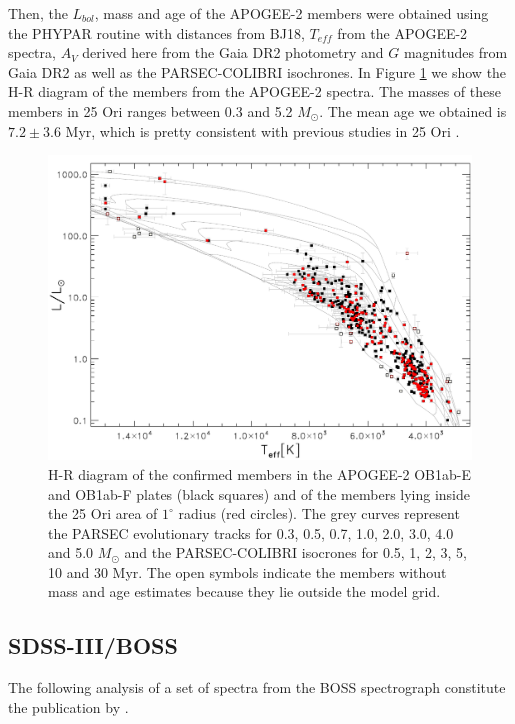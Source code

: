 \documentclass[12pt]{article}
\begin{document}
Then, the $L_{bol}$, mass and age of the APOGEE-2 members were obtained using the PHYPAR routine with distances from BJ18, $T_{eff}$ from the APOGEE-2 spectra, $A_V$ derived here from the Gaia DR2 photometry and $G$ magnitudes from Gaia DR2 as well as the PARSEC-COLIBRI isochrones. In Figure \ref{fig_APOGEE-2:HR} we show the H-R diagram of the members from the APOGEE-2 spectra. The masses of these members in 25 Ori ranges between 0.3 and 5.2 $M_\odot$. The mean age we obtained is $7.2\pm3.6$ Myr, which is pretty consistent with previous studies in 25 Ori \citep[][ and references therein]{Briceno2018}.

\begin{figure}[ht!]
	\centering
	\includegraphics[width=1.\textwidth]{HR_APOGEE-2.pdf}
	\caption[H-R diagram of the 25 Ori confirmed members from APOGEE-2 spectra.]{H-R diagram of the confirmed members in the APOGEE-2 OB1ab-E and OB1ab-F plates (black squares) and of the members lying inside the 25 Ori area of $1^\circ$ radius (red circles). The grey curves represent the PARSEC evolutionary tracks for 0.3, 0.5, 0.7, 1.0, 2.0, 3.0, 4.0 and 5.0 $M_\odot$ and the PARSEC-COLIBRI isocrones for 0.5, 1, 2, 3, 5, 10 and 30 Myr. The open symbols indicate the members without mass and age estimates because they lie outside the model grid.}
	\label{fig_APOGEE-2:HR}
\end{figure}

\subsection{SDSS-III/BOSS \citep{Suarez2017}}
\label{sec:BOSS}
The following analysis of a set of spectra from the BOSS spectrograph constitute the publication by \citet{Suarez2017}.
\end{document}
